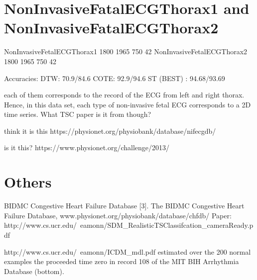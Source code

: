 \section{NonInvasiveFatalECGThorax1 and NonInvasiveFatalECGThorax2}

NonInvasiveFetalECGThorax1	1800	1965	750	42
NonInvasiveFetalECGThorax2	1800	1965	750	42

Accuracies:
DTW: 70.9/84.6
COTE: 92.9/94.6
ST (BEST) : 94.68/93.69

each of them corresponds to the record of the ECG from left and right thorax. Hence, in this data set, each type of non-invasive fetal ECG corresponds to a 2D time series.
What TSC  paper is it from though?

think it is this
https://physionet.org/physiobank/database/nifecgdb/

is it this?
https://www.physionet.org/challenge/2013/

\section{Others}

BIDMC Congestive Heart Failure Database [3].
The BIDMC Congestive Heart Failure Database, www.physionet.org/physiobank/database/chfdb/
Paper:
http://www.cs.ucr.edu/~eamonn/SDM_RealisticTSClassifcation_cameraReady.pdf


http://www.cs.ucr.edu/~eamonn/ICDM_mdl.pdf
estimated over the 200 normal examples the proceeded time zero in record 108 of the MIT BIH Arrhythmia Database (bottom).
